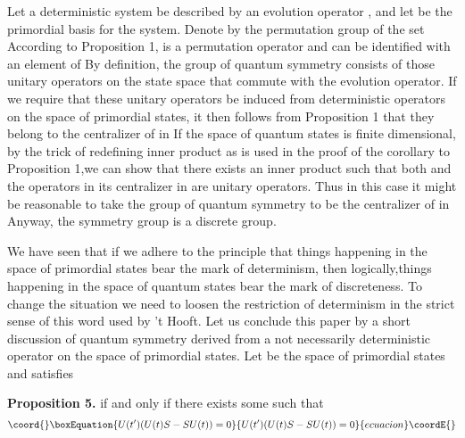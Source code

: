 \documentclass[a4paper,12pt]{article}
\begin{document}
Let a deterministic system be described by an evolution operator \coordHE{}, and let \coordHE{} be the primordial basis for
the system. Denote by \coordHE{} the permutation group of the set \coordHE{} According
to Proposition 1, \coordHE{} is a permutation operator and can be
identified with an element of \coordHE{} By definition, the group of quantum
symmetry consists of those unitary operators on the state space that commute
with the evolution operator. If we require that these unitary operators be
induced from deterministic operators on the space of primordial states, it
then follows from Proposition 1 that they belong to the centralizer of \coordHE{} in \coordHE{} If the space of quantum states is finite
dimensional, by the trick of redefining inner product as is used in the
proof of the corollary to Proposition 1,we can show that there exists an
inner product such that both \coordHE{} and the operators in its
centralizer in \coordHE{} are unitary operators. Thus in this case it might be
reasonable to take the group of quantum symmetry to be the centralizer of \coordHE{} in \coordHE{}Anyway, the symmetry group is a discrete group.

We have seen that if we adhere to the principle that things happening in the
space of primordial states bear the mark of determinism, then
logically,things happening in the space of quantum states bear the mark of
discreteness. To change the situation we need to loosen the restriction of
determinism in the strict sense of this word used by 't Hooft. Let us
conclude this paper by a short discussion of quantum symmetry derived from a
not necessarily deterministic operator on the space of primordial states.
Let \coordHE{} be the space of primordial states and \coordHE{} satisfies \coordHE{}

\textbf{Proposition 5.} \coordHE{} if and only if there exists some \coordHE{} such that
\begin{equation}\coord{}\boxEquation{
U(t^{\prime })(U(t)S-SU(t))=0
}{
U(t^{\prime })(U(t)S-SU(t))=0
}{ecuacion}\coordE{}\end{equation}
\end{document}
